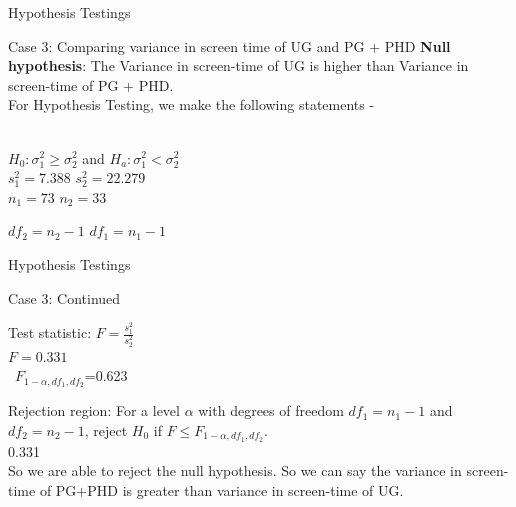 \documentclass{beamer}
\begin{document}
\begin{frame}{Hypothesis Testings}
\begin{block}{Case 3: Comparing variance in screen time of UG and PG + PHD}
\textbf{Null hypothesis}: The Variance in screen-time of UG is higher than Variance in screen-time of PG + PHD.\\



 For Hypothesis Testing, we make the following statements -

\par
\begin{center}
    \\
   $H_{0}: \sigma_{1}^{2} \geq \sigma_{2}^{2}$  and  $H_{a}: \sigma_{1}^{2} < \sigma_{2}^{2}$ \\
  
   $s_{1}^{2}=7.388$ \quad   $s_{2}^{2}= 22.279$\\
          $n_1 = 73$ \quad
    $n_2 = 33$  
    
    $df_{2}=n_{2}-1$  $df_{1}=n_{1}-1$  \\
   
\end{center}
\end{block}
\end{frame}

\begin{frame}{Hypothesis Testings}
\begin{block}{Case 3: Continued}
\begin{center}
         Test statistic: $F=\frac{s_{1}^{2}}{s_{2}^{2}}$\\
     $F=0.331$\\\
     $F_{1-\alpha, df_{1}, df_{2}}$=0.623\\
     \end{center}
 Rejection region: For a level $\alpha$ with degrees of freedom $df_{1}=n_{1}-1$ and $df_{2}=n_{2}-1$, reject $H_{0}$ if $F \leq F_{1-\alpha, df_{1}, df_{2}}$.\\
0.331 \leq 0.623\\
So we are able to reject the null hypothesis. So we can say the variance in screen-time of PG+PHD is greater than variance in screen-time of UG.\\
\end{block}
\end{frame}
\end{document}
